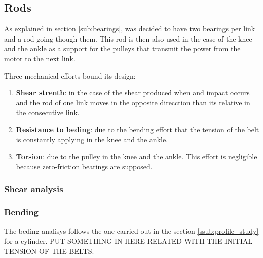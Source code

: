 \subsection{Rods} %
\label{sub:rods}
As explained in section \ref{sub:bearings}, was decided to have two bearings per link and a rod going though them.
This rod is then also used in the case of the knee and the ankle as a support for the pulleys that transmit the power from the motor to the next link.

Three mechanical efforts bound its design:
\begin{enumerate}
  \item \textbf{Shear strenth}: in the case of the shear produced when and impact occurs and the rod of one link moves in the opposite direcction than its relative in the consecutive link.
  \item \textbf{Resistance to beding}: due to the bending effort that the tension of the belt is constantly applying in the knee and the ankle.
  \item \textbf{Torsion}: due to the pulley in the knee and the ankle. 
  This effort is negligible because zero-friction bearings are supposed.
\end{enumerate}

  \subsubsection{Shear analysis} %
  \label{ssub:shear_analysis}


  \subsubsection{Bending} %
  \label{ssub:bending}
  The beding analisys follows the one carried out in the section \ref{ssub:profile_study} for a cylinder.
  PUT SOMETHING IN HERE RELATED WITH THE INITIAL TENSION OF THE BELTS.


